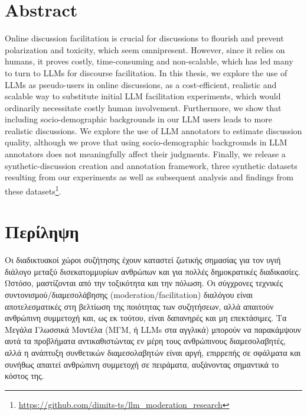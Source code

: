 %

\let\cleardoublepage\clearpage

\chapter*{Abstract}
\label{sec:abstract}

Online discussion facilitation is crucial for discussions to flourish and prevent polarization and toxicity, which seem omnipresent. However, since it relies on humans, it proves costly, time-consuming and non-scalable, which has led many to turn to LLMs for discourse facilitation. In this thesis, we explore the use of LLMs as pseudo-users in online discussions, as a cost-efficient, realistic and scalable way to substitute initial LLM facilitation experiments, which would ordinarily necessitate costly human involvement. Furthermore, we show that including socio-demographic backgrounds in our LLM users leads to more realistic discussions. We explore the use of LLM annotators to estimate discussion quality, although we prove that using socio-demographic backgrounds in LLM annotators does not meaningfully affect their judgments. Finally, we release a synthetic-discussion creation and annotation framework, three synthetic datasets resulting from our experiments as well as subsequent analysis and findings from these datasets\footnote{\url{https://github.com/dimits-ts/llm_moderation_research}}.

\chapter*{Περίληψη}
\label{sec:abstract_greek}


Οι διαδικτυακοί χώροι συζήτησης έχουν καταστεί ζωτικής σημασίας για τον υγιή διάλογο μεταξύ δισεκατομμυρίων ανθρώπων και για πολλές δημοκρατικές διαδικασίες. Ωστόσο, μαστίζονται από την τοξικότητα και την πόλωση. Οι σύγχρονες τεχνικές συντονισμού/διαμεσολάβησης (moderation/facilitation) διαλόγου είναι αποτελεσματικές στη βελτίωση της ποιότητας των συζητήσεων, αλλά απαιτούν ανθρώπινη συμμετοχή και, ως εκ τούτου, είναι δαπανηρές και μη επεκτάσιμες. Τα Μεγάλα Γλωσσικά Μοντέλα (ΜΓΜ, ή LLMs στα αγγλικά) μπορούν να παρακάμψουν αυτά τα προβλήματα αντικαθιστώντας εν μέρη τους ανθρώπινους διαμεσολαβητές, αλλά η ανάπτυξη συνθετικών διαμεσολαβητών είναι αργή, επιρρεπής σε σφάλματα και συνήθως απαιτεί ανθρώπινη συμμετοχή σε πειράματα, αυξάνοντας σημαντικά το κόστος της. 

